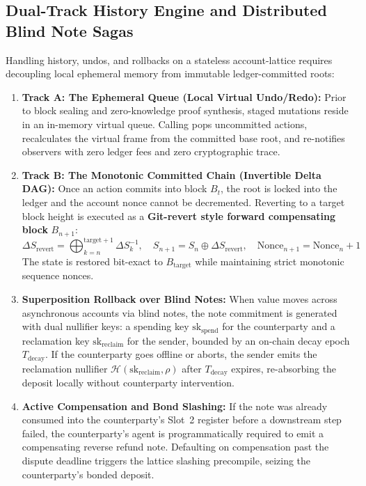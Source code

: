 \documentclass[a4paper,11pt,twoside,parskip=half-,headings=small]{scrartcl}
\begin{document}
\subsection{Dual-Track History Engine and Distributed Blind Note Sagas}
\label{sec:som_history_sagas}

Handling history, undos, and rollbacks on a stateless account-lattice requires decoupling local ephemeral memory from immutable ledger-committed roots:
\begin{enumerate}
  \item \textbf{Track A: The Ephemeral Queue (Local Virtual Undo/Redo):} Prior to block sealing and zero-knowledge proof synthesis, staged mutations reside in an in-memory virtual queue. Calling  pops uncommitted actions, recalculates the virtual frame from the committed base root, and re-notifies observers with zero ledger fees and zero cryptographic trace.
  \item \textbf{Track B: The Monotonic Committed Chain (Invertible Delta DAG):} Once an action commits into block $B_t$, the root is locked into the ledger and the account nonce cannot be decremented. Reverting to a target block height is executed as a \textbf{Git-revert style forward compensating block} $B_{n+1}$:
  \begin{equation}
    \Delta S_{\text{revert}} = \bigoplus_{k=n}^{\text{target}+1} \Delta S_k^{-1}, \quad S_{n+1} = S_n \oplus \Delta S_{\text{revert}}, \quad \text{Nonce}_{n+1} = \text{Nonce}_n + 1
  \end{equation}
  The state is restored bit-exact to $B_{\text{target}}$ while maintaining strict monotonic sequence nonces.
  \item \textbf{Superposition Rollback over Blind Notes:} When value moves across asynchronous accounts via blind notes, the note commitment is generated with dual nullifier keys: a spending key $\text{sk}_{\text{spend}}$ for the counterparty and a reclamation key $\text{sk}_{\text{reclaim}}$ for the sender, bounded by an on-chain decay epoch $T_{\text{decay}}$. If the counterparty goes offline or aborts, the sender emits the reclamation nullifier $\mathcal{H}(\text{sk}_{\text{reclaim}}, \rho)$ after $T_{\text{decay}}$ expires, re-absorbing the deposit locally without counterparty intervention.
  \item \textbf{Active Compensation and Bond Slashing:} If the note was already consumed into the counterparty's Slot~2 register before a downstream step failed, the counterparty's agent is programmatically required to emit a compensating reverse refund note. Defaulting on compensation past the dispute deadline triggers the lattice slashing precompile, seizing the counterparty's bonded deposit.
\end{enumerate}
\end{document}

